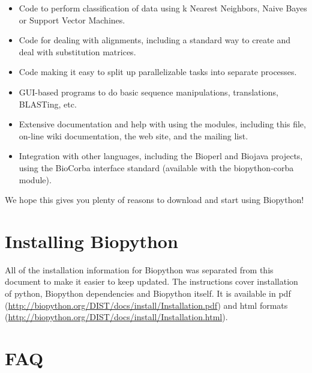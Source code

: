 \documentclass{report}
\begin{document}
\begin{itemize}
  \item Code to perform classification of data using k Nearest Neighbors, Naive Bayes or Support Vector Machines.

  \item Code for dealing with alignments, including a standard way to create and deal with substitution matrices.

  \item Code making it easy to split up parallelizable tasks into separate processes.

  \item GUI-based programs to do basic sequence manipulations, translations, BLASTing, etc.

  \item Extensive documentation and help with using the modules, including this file, on-line wiki documentation, the web site, and the mailing list.

  \item Integration with other languages, including the Bioperl and Biojava projects, using the BioCorba interface standard (available with the biopython-corba module).

\end{itemize}

We hope this gives you plenty of reasons to download and start using Biopython!

\section{Installing Biopython}

All of the installation information for Biopython was separated from
this document to make it easier to keep updated. The instructions cover
installation of python, Biopython dependencies and Biopython itself.
It is available in pdf
(\url{http://biopython.org/DIST/docs/install/Installation.pdf})
and html formats
(\url{http://biopython.org/DIST/docs/install/Installation.html}).

\section{FAQ}
\end{document}
